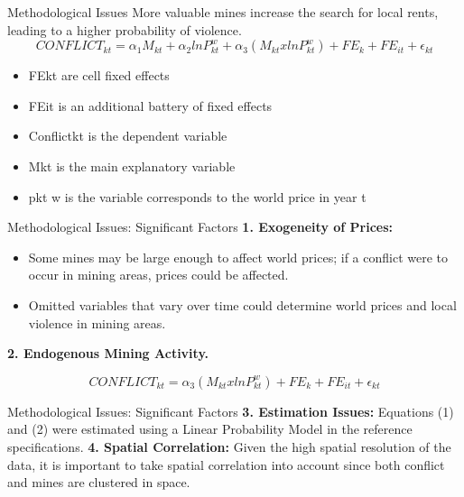 \documentclass[pdftex,12pt,xcolor=pdftex,table]{beamer}
\theoremstyle{definition}
\theoremstyle{remark}
\numberwithin{equation}{section}
\numberwithin{figure}{section}
\begin{document}
		\begin{frame}{Methodological Issues}
			\justifying
 	         More valuable mines increase the search for local rents, leading to a higher probability of violence.
  \[CONFLICT_{kt}= \alpha_{1} M_{kt}+ \alpha_{2}ln P^w_{kt}+ \alpha_{3}(M_{kt}xln P^w_{kt})+ FE_{k}+FE_{it}+\epsilon_{kt}\]  
  
	\begin{itemize}
\item \alert{FEkt}  are cell fixed effects
\item \alert{FEit} is an additional battery of fixed effects 
\item \alert{Conflictkt}   is the dependent variable
\item \alert{Mkt}  is the main explanatory variable
\item \alert{pkt} w is the variable corresponds to the world price in year t 

    \end{itemize}	         

        \end{frame}

	    \begin{frame}{Methodological Issues: Significant Factors}
			\justifying
 	        \textbf {1. Exogeneity of Prices:}
            \begin{itemize}
            \item Some mines may be large enough to affect world prices; if a conflict were to occur in mining areas, prices could be affected.
            \item Omitted variables that vary over time could determine world prices and local violence in mining areas.
    \end{itemize}
\vfill 

            \textbf {2. Endogenous Mining Activity.}

            \[ CONFLICT_{kt}=  \alpha_{3}(M_{kt}xln P^w_{kt})+ FE_{k}+FE_{it}+\epsilon_{kt}\]  
            
    \end{frame}
 
 
 	    \begin{frame}{Methodological Issues: Significant Factors}
			\justifying
            \textbf {3. Estimation Issues:}
            Equations (1) and (2) were estimated using a Linear Probability Model in the reference specifications.
    \vfill 
            \textbf {4. Spatial Correlation:}
            Given the high spatial resolution of the data, it is important to take spatial correlation into account since both conflict and mines are clustered in space. 
   \end{frame}
   
\end{document}
